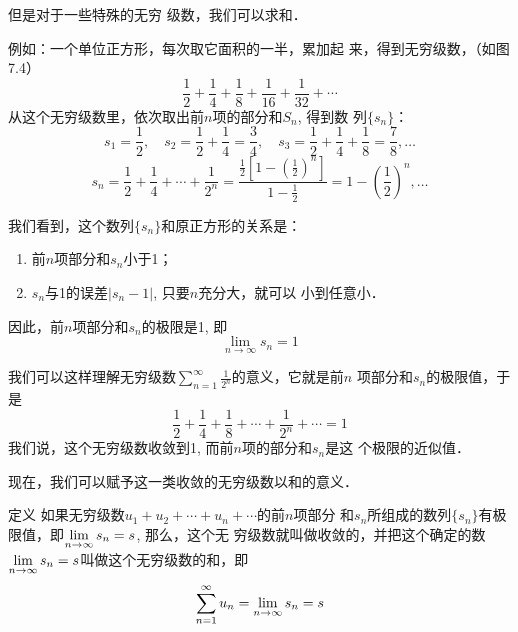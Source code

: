 但是对于一些特殊的无穷
级数，我们可以求和．

\begin{figure}[htp]
    \centering
    \caption{}
\end{figure}

例如：一个单位正方形，每次取它面积的一半，累加起
来，得到无穷级数，（如图7.4）
\[\frac{1}{2}+\frac{1}{4}+\frac{1}{8}+\frac{1}{16}+\frac{1}{32}+\cdots\]
从这个无穷级数里，依次取出前$n$项的部分和$S_n$, 得到数
列$\{s_n\}$：
\[s_1=\frac{1}{2},\quad s_2=\frac{1}{2}+\frac{1}{4}=\frac{3}{4},\quad s_3=\frac{1}{2}+\frac{1}{4}+\frac{1}{8}=\frac{7}{8},\ldots\]
\[s_n=\frac{1}{2}+\frac{1}{4}+\cdots+\frac{1}{2^n}=\frac{\frac{1}{2}\left[1-\left(\frac{1}{2}\right)^n\right]}{1-\frac{1}{2}}=1-\left(\frac{1}{2}\right)^n,\ldots\]

我们看到，这个数列$\{s_n\}$和原正方形的关系是：
\begin{enumerate}
    \item 前$n$项部分和$s_n$小于1；
    \item $s_n$与1的误差$|s_n-1|$, 只要$n$充分大，就可以
小到任意小．
\end{enumerate}
因此，前$n$项部分和$s_n$的极限是1, 即
\[\lim_{n\to\infty} s_n=1 \]

我们可以这样理解无穷级数$\displaystyle\sum_{n=1}^{\infty}\frac{1}{2^n}$的意义，它就是前$n$
项部分和$s_n$的极限值，于是
\[\frac{1}{2}+\frac{1}{4}+\frac{1}{8}+\cdots+\frac{1}{2^n}+\cdots=1 \]
我们说，这个无穷级数收敛到1, 而前$n$项的部分和$s_n$是这
个极限的近似值．

现在，我们可以赋予这一类收敛的无穷级数以和的意义．

\begin{blk}{定义}
    如果无穷级数$u_1+u_2+\cdots+u_n+\cdots$的前$n$项部分
和$s_n$所组成的数列$\{s_n\}$有极限值，即$\displaystyle\lim_{n\to\infty}s_n=s$, 那么，这个无
穷级数就叫做收敛的，并把这个确定的数$\displaystyle\lim_{n\to\infty}s_n=s$叫做这个无穷级数的和，即
\[\sum_{n=1}^{\infty}u_n=\displaystyle\lim_{n\to\infty}s_n=s\]
\end{blk}
 
